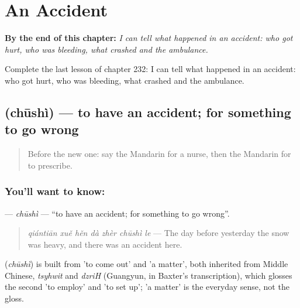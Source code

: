 
\chapter{An Accident}
\label{ch:zh-an-accident}

\begin{chapteropening}
\textbf{By the end of this chapter:} \emph{I can tell what happened in an accident: who got hurt, who was bleeding, what crashed and the ambulance.}

Complete the last lesson of chapter 232: I can tell what happened in an accident: who got hurt, who was bleeding, what crashed and the ambulance.
\end{chapteropening}

\section[\texorpdfstring{\zh{出事} (chūshì)}{出事 (chūshì)}]{ (chūshì) — to have an accident; for something to go wrong}

\label{lesson:ZH-C232-chushi}



\begin{quote}
Before the new one: say the Mandarin for a nurse, then the Mandarin for to prescribe.
\end{quote}

\subsection*{You'll want to know: }
\textbf{} — \emph{chūshì} — \textquotedblleft{}to have an accident; for something to go wrong\textquotedblright{}.

\begin{quote}
\textbf{} \emph{qiántiān xuě hěn dà zhèr chūshì le} — The day before yesterday the snow was heavy, and there was an accident here.
\end{quote}

\begin{cousinweb}
\textbf{} (\emph{chūshì}) is built from  'to come out' and  'a matter', both inherited from Middle Chinese, \emph{tsyhwit} and \emph{dzriH} (Guangyun, in Baxter's transcription), which glosses the second 'to employ' and 'to set up'; 'a matter' is the everyday sense, not the gloss.
\end{cousinweb}

